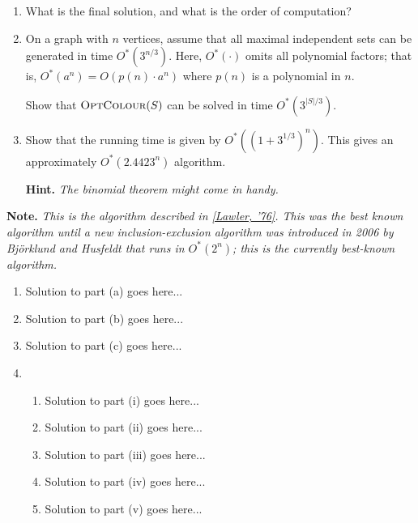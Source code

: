 \documentclass{article}
\begin{document}
\begin{question}
\begin{enumerate}[label = (\alph*)]
\begin{enumerate}[label = (\roman*)]
        \item What is the final solution, and what is the order of computation?

        \item On a graph with $n$ vertices, assume that all maximal independent sets can be generated in time $O^*(3^{n/3})$. Here, $O^*(\cdot)$ omits all polynomial factors; that is, $O^*(a^n) = O(p(n) \cdot a^n)$ where $p(n)$ is a polynomial in $n$.

        Show that $\mathsf{\textsc{OptColour}}(S)$ can be solved in time $O^*\left(3^{\lvert S \rvert /3}\right)$.

        \item Show that the running time is given by $O^*\left((1 + 3^{1/3})^n\right)$. This gives an approximately $O^*(2.4423^n)$ algorithm.

        {\bfseries Hint.} {\em The binomial theorem might come in handy.}
    \end{enumerate}
\end{enumerate}

{\bfseries Note.} {\em This is the algorithm described in \href{https://www.semanticscholar.org/paper/A-Note-on-the-Complexity-of-the-Chromatic-Number-Lawler/0742e3eac4efae7db8c0ac816223e2e4c51a93f6}{[Lawler, '76]}. This was the best known algorithm until a new inclusion-exclusion algorithm was introduced in 2006 by Bj\"orklund and Husfeldt that runs in $O^*(2^n)$; this is the currently best-known algorithm.}
\end{question}

\begin{solution}
\begin{enumerate}[label = (\alph*)]
    \item Solution to part (a) goes here...

    \item Solution to part (b) goes here...

    \item Solution to part (c) goes here...

    \item
    \begin{enumerate}[label = (\roman*)]
        \item Solution to part (i) goes here...

        \item Solution to part (ii) goes here...

        \item Solution to part (iii) goes here...

        \item Solution to part (iv) goes here...

        \item Solution to part (v) goes here...
    \end{enumerate}
\end{enumerate}
\end{solution}
\end{document}
